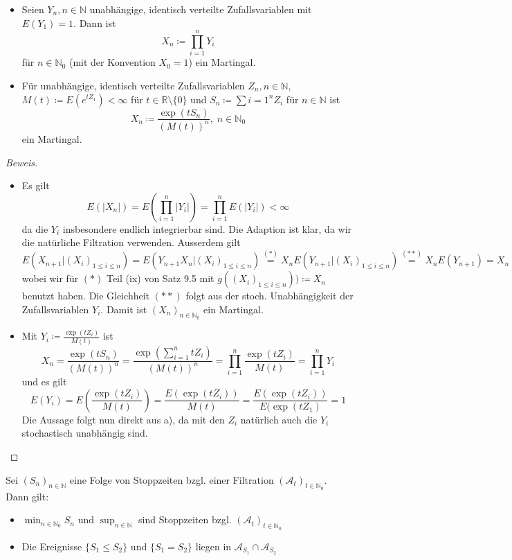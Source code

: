 \documentclass[10pt]{article}
\newenvironment{Aufgabe}[2][Aufgabe]{\begin{trivlist}
\item[\hskip \labelsep {\bfseries #1}\hskip \labelsep {\bfseries #2.}]}{\end{trivlist}}
\begin{document}
 \newpage
 
 \begin{Aufgabe}{2} %
 \begin{itemize}
 \item[a)]
	Seien $Y_n, n \in \mathbb{N}$ unabhängige, identisch verteilte Zufallsvariablen mit $E(Y_1)=1$. Dann ist 
	$$
	X_n \coloneqq \prod_{i=1}^n Y_i
	$$ 
	für $n \in \mathbb{N}_0$ (mit der Konvention $X_0 = 1$) ein Martingal.
 \item[b)]
	Für unabhängige, identisch verteilte Zufallsvariablen $Z_n, n \in \mathbb{N}$, $M(t) \coloneqq E(e^{tZ_1}) < \infty$ für $t \in \mathbb{R} \setminus \{0\}$ und $S_n \coloneqq \sum{i=1}^n Z_i$ für $n \in \mathbb{N}$ ist
	$$
	X_n \coloneqq \frac{\exp(tS_n)}{(M(t))^n}, \; n \in \mathbb{N}_0
	$$
	ein Martingal.
\end{itemize}
\end{Aufgabe}

\begin{proof}[Beweis]  
 \begin{itemize}
 \item[a)]
	Es gilt 
	$$
	E(|X_n|) = E(\prod_{i=1}^n |Y_i|) = \prod_{i=1}^n E(|Y_i|) < \infty 
	$$
	da die $Y_i$ insbesondere endlich integrierbar sind. Die Adaption ist klar, da wir die natürliche Filtration verwenden. Ausserdem gilt
	$$
	E(X_{n+1}|(X_i)_{1 \leq i \leq n}) = E(Y_{n+1}X_{n}|(X_i)_{1 \leq i \leq n}) \overset{(*)}{=} X_n E(Y_{n+1} | (X_i)_{1 \leq i \leq n}) \overset{(**)}{=}  X_n E(Y_{n+1}) = X_n 
	$$
	wobei wir für $(*)$ Teil (ix) von Satz 9.5 mit $g((X_i)_{1 \leq i \leq n})) \coloneqq X_n $ benutzt haben. Die Gleichheit $(**)$ folgt aus der stoch. Unabhängigkeit der Zufallsvariablen $Y_i$. 
	Damit ist $(X_n)_{n \in \mathbb{N}_0}$ ein Martingal.
 \item[b)] Mit $Y_i \coloneqq \frac{\exp(tZ_i)}{M(t)}$ ist
 $$
 X_n = \frac{\exp(tS_n)}{(M(t))^n} = \frac{\exp(\sum_{i=1}^n tZ_i)}{(M(t))^n} = \prod_{i=1}^n \frac{\exp(tZ_i)}{M(t)} = \prod_{i=1}^n Y_i
 $$
 und es gilt
 $$
 E(Y_i) = E\left(\frac{\exp(tZ_i)}{M(t)}\right) = \frac{E(\exp(tZ_i))}{M(t)} = \frac{E(\exp(tZ_i))}{E(\exp(tZ_1)} = 1
 $$
 Die Aussage folgt nun direkt aus a), da mit den $Z_i$ natürlich auch die $Y_i$ stochastisch unabhängig sind.
 
\end{itemize}
\end{proof}


\begin{Aufgabe}{3} %
	Sei $(S_n)_{n \in \mathbb{N}}$ eine Folge von Stoppzeiten bzgl. einer Filtration $(\mathcal{A}_t)_{t \in \mathbb{N}_0}$. \\
	Dann gilt:
	\begin{itemize}
		\item[(i)] $\min_{n \in \mathbb{N}_0} S_n$ und $\sup_{n \in \mathbb{N}}$ sind Stoppzeiten bzgl. $(\mathcal{A}_t)_{t \in \mathbb{N}_0}$
		\item[(ii)] Die Ereignisse $\{S_1 \leq S_2\}$ und $\{S_1= S_2\}$ liegen in $\mathcal{A}_{S_1} \cap \mathcal{A}_{S_2}$
	\end{itemize}
\end{Aufgabe}
\end{document}
